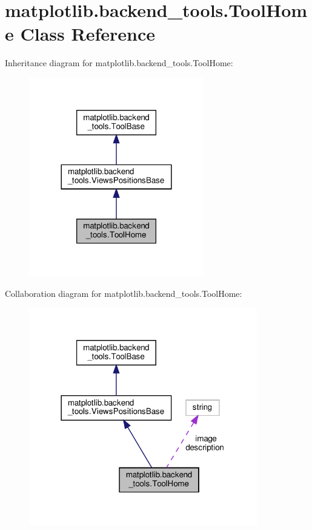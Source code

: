 \hypertarget{classmatplotlib_1_1backend__tools_1_1ToolHome}{}\section{matplotlib.\+backend\+\_\+tools.\+Tool\+Home Class Reference}
\label{classmatplotlib_1_1backend__tools_1_1ToolHome}


Inheritance diagram for matplotlib.\+backend\+\_\+tools.\+Tool\+Home\+:
\nopagebreak
\begin{figure}[H]
\begin{center}
\leavevmode
\includegraphics[width=216pt]{classmatplotlib_1_1backend__tools_1_1ToolHome__inherit__graph}
\end{center}
\end{figure}


Collaboration diagram for matplotlib.\+backend\+\_\+tools.\+Tool\+Home\+:
\nopagebreak
\begin{figure}[H]
\begin{center}
\leavevmode
\includegraphics[width=282pt]{classmatplotlib_1_1backend__tools_1_1ToolHome__coll__graph}
\end{center}
\end{figure}
